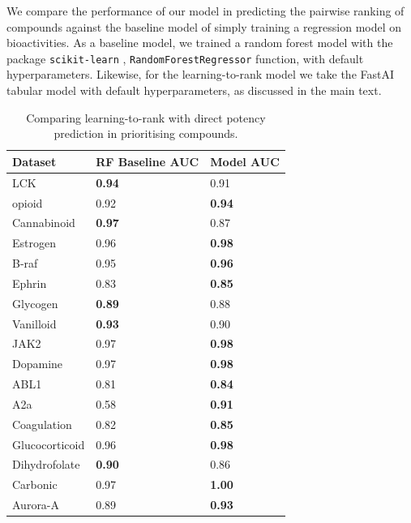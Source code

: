 We compare the performance of our model in predicting the pairwise ranking of compounds against the baseline model of simply training a regression model on bioactivities. As a baseline model, we trained a random forest model with the package \texttt{scikit-learn} \cite{scikit-learn}, \texttt{RandomForestRegressor} function, with default hyperparameters. Likewise, for the learning-to-rank model we take the FastAI tabular model with default hyperparameters, as discussed in the main text.

\begin{table}[]
\centering
\begin{tabular}{|l|l|l|}
\hline
\textbf{Dataset} & \textbf{RF Baseline AUC} & \textbf{Model AUC}  \\ \hline
LCK              & \textbf{0.94}              & 0.91          \\ \hline
opioid           & 0.92                & \textbf{0.94} \\ \hline
Cannabinoid      & \textbf{0.97}               & 0.87          \\ \hline
Estrogen         & 0.96               & \textbf{0.98} \\ \hline
B-raf            & 0.95              & \textbf{0.96} \\ \hline
Ephrin           & 0.83               & \textbf{0.85} \\ \hline
Glycogen         & \textbf{0.89}             & 0.88         \\ \hline
Vanilloid        & \textbf{0.93}              & 0.90          \\ \hline
JAK2             & 0.97              & \textbf{0.98} \\ \hline
Dopamine         & 0.97               & \textbf{0.98} \\ \hline
ABL1             & 0.81               & \textbf{0.84} \\ \hline
A2a              & 0.58              & \textbf{0.91} \\ \hline
Coagulation      & 0.82                & \textbf{0.85}  \\ \hline
Glucocorticoid   & 0.96             & \textbf{0.98} \\ \hline
Dihydrofolate    & \textbf{0.90}               & 0.86          \\ \hline
Carbonic         & 0.97              & \textbf{1.00} \\ \hline
Aurora-A         & 0.89               & \textbf{0.93} \\ \hline
\end{tabular}
\caption{Comparing learning-to-rank with direct potency prediction in prioritising compounds.}
\label{table1}
\end{table}


